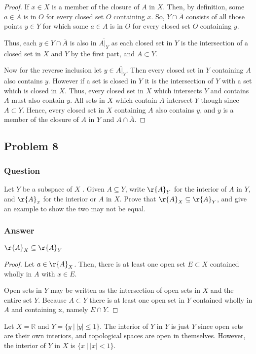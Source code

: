 \documentclass[10pt]{article}
\begin{document}
\begin{proof}
If $x\in X$ is a member of the closure of $A$ in $X$. Then, by definition, some $a \in A$ is in $O$ for every closed set $O$ containing $x$. So, $Y \cap \overline{A}$ consists of all those points $y\in Y$ for which some $a \in A$ is in $O$ for every closed set $O$ containing $y$.

Thus, each $y \in Y \cap \overline{A}$ is also in $\overline{A|_Y}$ as each closed set in $Y$ is the intersection of a closed set in $X$ and $Y$ by the first part, and $A \subset Y$.

Now for the reverse inclusion let $y \in \overline{A|_Y}$. Then every closed set in $Y$ containing $A$ also contains $y$. However if a set is closed in $Y$ it is the intersection of $Y$ with a set which is closed in $X$. Thus, every closed set in $X$ which intersects $Y$ and contains $A$ must also contain $y$. All sets in $X$ which contain $A$ intersect $Y$ though since $A\subset Y$. Hence, every closed set in $X$ containing $A$ also contains $y$, and $y$ is a member of the closure of $A$ in $Y$ and $A \cap \overline{A}$.

\end{proof}
\subsection{Problem 8}

\subsubsection{Question}
Let $Y$ be a subspace of $X$ . Given $A \subseteq Y$, write $\r{A}_Y$ for the interior of $A$ in $Y$, and $\r{A}_x$ for the interior or $A$ in $X$. Prove that $\r{A}_X \subseteq \r{A}_Y$, and give an example to show the two may not be equal.
\subsubsection{Answer}

$\r{A}_X \subseteq \r{A}_Y$
\begin{proof}
Let $a \in \r{A}_X$. Then, there is at least one open set $E \subset X$ contained wholly in $A$ with $x \in E$. 

Open sets in $Y$ may be written as the intersection of open sets in $X$ and the entire set $Y$.  Because $A \subset Y$ there is at least one open set in $Y$ contained wholly in $A$ and containing x, namely $E \cap Y$. \end{proof}

Let $X=\mathbb{R}$ and $Y=\{y\ |\ |y|\leq 1\}$. The interior of $Y$ in $Y$ is just $Y$ since open sets are their own interiors, and topological spaces are open in themselves. However, the interior of $Y$ in $X$ is $\{ x \ |\ |x|<1\}$.
\end{document}
